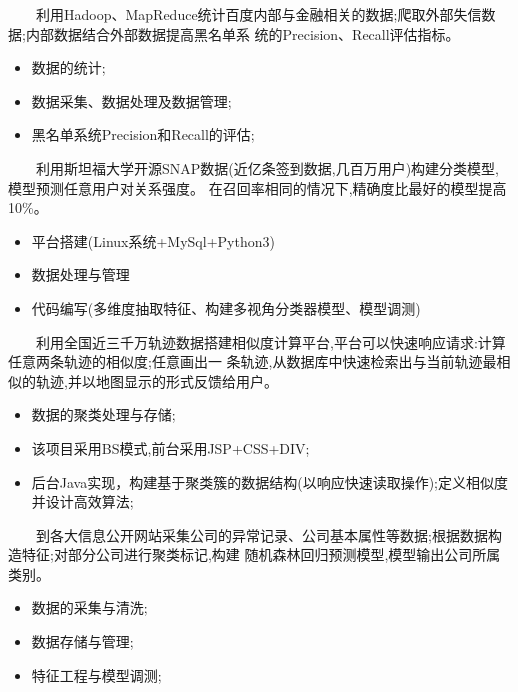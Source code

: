 \documentclass{resume}
\begin{document}
{\ \ \ \ 利用Hadoop、MapReduce统计百度内部与金融相关的数据;爬取外部失信数据;内部数据结合外部数据提高黑名单系
统的Precision、Recall评估指标。}
\begin{itemize}
  \item 数据的统计;
  \item 数据采集、数据处理及数据管理;
  \item 黑名单系统Precision和Recall的评估;
\end{itemize}
\medskip


{\ \ \ \ 利用斯坦福大学开源SNAP数据(近亿条签到数据,几百万用户)构建分类模型,模型预测任意用户对关系强度。
在召回率相同的情况下,精确度比最好的模型提高10\%。}
\begin{itemize}
  \item 平台搭建(Linux系统+MySql+Python3)
  \item 数据处理与管理
  \item 代码编写(多维度抽取特征、构建多视角分类器模型、模型调测)
\end{itemize}
\medskip


{\ \ \ \ 利用全国近三千万轨迹数据搭建相似度计算平台,平台可以快速响应请求:计算任意两条轨迹的相似度;任意画出一
条轨迹,从数据库中快速检索出与当前轨迹最相似的轨迹,并以地图显示的形式反馈给用户。}
\begin{itemize}
  \item 数据的聚类处理与存储;
  \item 该项目采用BS模式,前台采用JSP+CSS+DIV;
  \item 后台Java实现，构建基于聚类簇的数据结构(以响应快速读取操作);定义相似度并设计高效算法;
\end{itemize}
\medskip


{\ \ \ \ 到各大信息公开网站采集公司的异常记录、公司基本属性等数据;根据数据构造特征;对部分公司进行聚类标记,构建
随机森林回归预测模型,模型输出公司所属类别。}
\begin{itemize}
  \item 数据的采集与清洗;
  \item 数据存储与管理;
  \item 特征工程与模型调测;
\end{itemize}
\medskip
\end{document}
